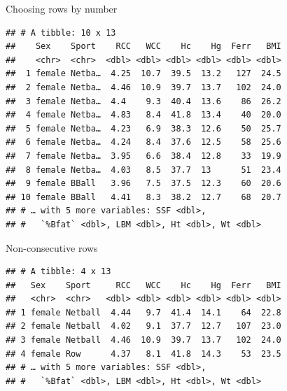 \documentclass[
  ignorenonframetext,
]{beamer}
\newenvironment{Shaded}{\begin{snugshade}}{\end{snugshade}}
\newcommand{\DecValTok}[1]{\textcolor[rgb]{0.00,0.00,0.81}{#1}}
\newcommand{\KeywordTok}[1]{\textcolor[rgb]{0.13,0.29,0.53}{\textbf{#1}}}
\newcommand{\NormalTok}[1]{#1}
\newcommand{\OperatorTok}[1]{\textcolor[rgb]{0.81,0.36,0.00}{\textbf{#1}}}
\newcommand{\StringTok}[1]{\textcolor[rgb]{0.31,0.60,0.02}{#1}}
\begin{document}
\begin{frame}[fragile]{Choosing rows by number}
\protect\hypertarget{choosing-rows-by-number}{}

\begin{Shaded}
\end{Shaded}

\begin{verbatim}
## # A tibble: 10 x 13
##    Sex    Sport    RCC   WCC    Hc    Hg  Ferr   BMI
##    <chr>  <chr>  <dbl> <dbl> <dbl> <dbl> <dbl> <dbl>
##  1 female Netba…  4.25  10.7  39.5  13.2   127  24.5
##  2 female Netba…  4.46  10.9  39.7  13.7   102  24.0
##  3 female Netba…  4.4    9.3  40.4  13.6    86  26.2
##  4 female Netba…  4.83   8.4  41.8  13.4    40  20.0
##  5 female Netba…  4.23   6.9  38.3  12.6    50  25.7
##  6 female Netba…  4.24   8.4  37.6  12.5    58  25.6
##  7 female Netba…  3.95   6.6  38.4  12.8    33  19.9
##  8 female Netba…  4.03   8.5  37.7  13      51  23.4
##  9 female BBall   3.96   7.5  37.5  12.3    60  20.6
## 10 female BBall   4.41   8.3  38.2  12.7    68  20.7
## # … with 5 more variables: SSF <dbl>,
## #   `%Bfat` <dbl>, LBM <dbl>, Ht <dbl>, Wt <dbl>
\end{verbatim}

\end{frame}

\begin{frame}[fragile]{Non-consecutive rows}
\protect\hypertarget{non-consecutive-rows}{}

\begin{Shaded}
\end{Shaded}

\begin{verbatim}
## # A tibble: 4 x 13
##   Sex    Sport     RCC   WCC    Hc    Hg  Ferr   BMI
##   <chr>  <chr>   <dbl> <dbl> <dbl> <dbl> <dbl> <dbl>
## 1 female Netball  4.44   9.7  41.4  14.1    64  22.8
## 2 female Netball  4.02   9.1  37.7  12.7   107  23.0
## 3 female Netball  4.46  10.9  39.7  13.7   102  24.0
## 4 female Row      4.37   8.1  41.8  14.3    53  23.5
## # … with 5 more variables: SSF <dbl>,
## #   `%Bfat` <dbl>, LBM <dbl>, Ht <dbl>, Wt <dbl>
\end{verbatim}

\end{frame}
\end{document}
